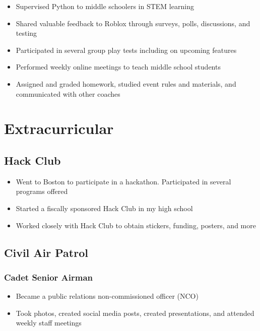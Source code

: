 \documentclass{my_cv}
\begin{document}
\begin{itemize}
    \item Supervised Python to middle schoolers in STEM learning
\end{itemize}

\begin{itemize}
    \item Shared valuable feedback to Roblox through surveys, polls, discussions, and testing
    \item Participated in several group play tests including on upcoming features
\end{itemize}

\begin{itemize}
    \item Performed weekly online meetings to teach middle school students
    \item Assigned and graded homework, studied event rules and materials, and communicated with other coaches
\end{itemize}

\section{Extracurricular}

\subsection{Hack Club}
\begin{itemize}
    \item Went to Boston to participate in a hackathon. Participated in several programs offered
    \item Started a fiscally sponsored Hack Club in my high school
    \item Worked closely with Hack Club to obtain stickers, funding, posters, and more
\end{itemize}

\subsection{Civil Air Patrol}
\subsubsection{Cadet Senior Airman}
\begin{itemize}
    \item Became a public relations non-commissioned officer (NCO)
    \item Took photos, created social media posts, created presentations, and attended weekly staff meetings
\end{itemize}
\end{document}
